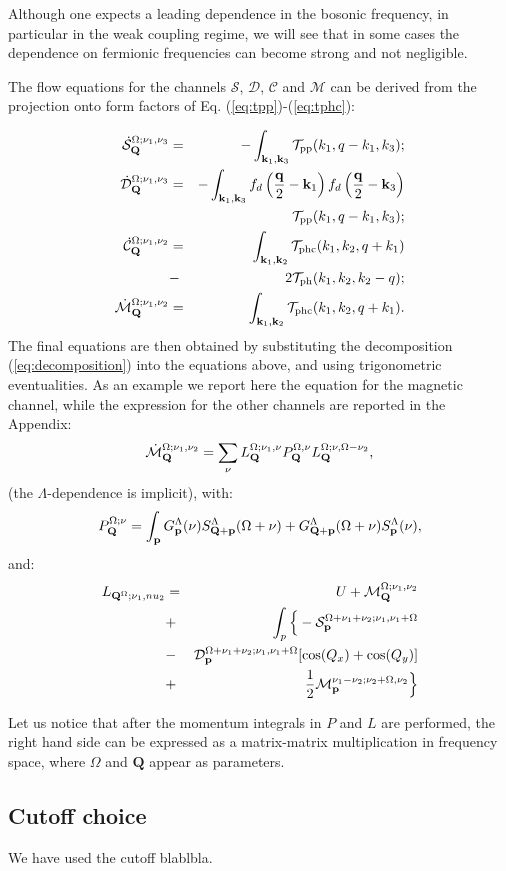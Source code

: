 Although one expects a leading dependence in the bosonic frequency, 
in particular in the weak coupling regime, we will see that in some cases the dependence on fermionic frequencies can become strong and not negligible.

The flow equations for the channels $\mathcal{S}$,  $\mathcal{D}$, $\mathcal{C}$ and $\mathcal{M}$ can be derived from the projection onto form factors of Eq. (\ref{eq:tpp})-(\ref{eq:tphc}):

\begin{eqnarray}
\dot{\mathcal{S}}_{\mathbf{Q}}^{\Omega;\nu_1,\nu_3}  &=& - \int _{\mathbf{k}_1, \mathbf{k}_3 } \mathcal{T}_{\mathrm{pp}}(k_1,q-k_1,k_3); \\ 
\dot{\mathcal{D}}_{\mathbf{Q}}^{\Omega;\nu_1,\nu_3}  &=& -
\int _{\mathbf{k}_1,\mathbf{k}_3}  f_d\left( {\frac{\mathbf{q}}{2} - \mathbf{k}_1} \right ) f_d\left ({\frac{\mathbf{q}}{2} - \mathbf{k}_3} \right)  \nonumber \\ 
 &&\mathcal{T}_{\mathrm{pp}}(k_1,q-k_1,k_3) ; 
\\
\nonumber
\dot{\mathcal{C}}_{\mathbf{Q}}^{\Omega;\nu_1,\nu_2} &=& 
\int _{\mathbf{k}_1,\mathbf{k}_2}   \mathcal{T}_{\mathrm{phc}}(k_1,k_2,q+k_1)\\ &-&2\mathcal{T}_{\mathrm{ph}}(k_1,k_2,k_2-q) ; 
\\ 
\dot{\mathcal{M}}_{\mathbf{Q}}^{\Omega;\nu_1,\nu_2} & =& 
\int _{\mathbf{k}_1,\mathbf{k}_2}  \mathcal{T}_{\mathrm{phc}}(k_1,k_2,q+k_1). 
\end{eqnarray}
The final equations are then obtained by substituting the decomposition (\ref{eq:decomposition}) into the equations above, and using trigonometric eventualities.
As an example we report here the equation for the magnetic channel, while the expression for the other channels are reported in the Appendix: 
\begin{equation}
\dot{\mathcal{M}}_{\mathbf{Q}}^{\Omega;\nu_1,\nu_2} = \sum_{\nu} L^{\Omega; \nu_1,\nu}_{\mathbf{Q}} P_{\mathbf{Q}}^{\Omega,\nu} L^{\Omega; \nu,\Omega-\nu_2}_{\mathbf{Q}}, 
\end{equation} 	   
(the $\Lambda$-dependence is implicit), with: 
\begin{equation}
P_{\mathbf{Q}}^{\Omega;\nu} = \int_{\mathbf{p}}  G^\Lambda_{\mathbf{p}}(\nu)S^\Lambda_{\mathbf{Q}+\mathbf{p}}
(\Omega+\nu) +G^\Lambda_{\mathbf{Q}+\mathbf{p}}(\Omega+\nu)
S^\Lambda_{\mathbf{p}} (\nu), 
\end{equation} 
and: 
\begin{eqnarray} 
\nonumber
L_{\mathbf{Q}^\Omega;\nu_1,nu_2}&=&U+\mathcal{M}_{\mathbf{Q}}^{\Omega;\nu_1,\nu_2} \\
\nonumber 
&+& \int_p \Big \{- \mathcal{S}_{\mathbf{p}}^{\Omega+\nu_1+\nu_2;\nu_1,\nu_1+\Omega}  
 \\
 \nonumber 
&-& \mathcal{D}_{\mathbf{p}}^{\Omega+\nu_1+\nu_2;\nu_1,\nu_1+\Omega}[\cos(Q_x)+\cos(Q_y)]
 \\ 
&+&\frac{1}{2}  \mathcal{M}_{\mathbf{p}}^{\nu_1-\nu_2; \nu_2+\Omega,\nu_2} 
\Big \} 
\end{eqnarray} 

Let us notice that after the momentum integrals in $P$ and $L$ are performed, the right hand side can be expressed as a matrix-matrix multiplication in frequency space, where $\Omega$ and $\mathbf{Q}$ appear as parameters. 

\subsection{Cutoff choice}

We have used the cutoff blablbla. 
